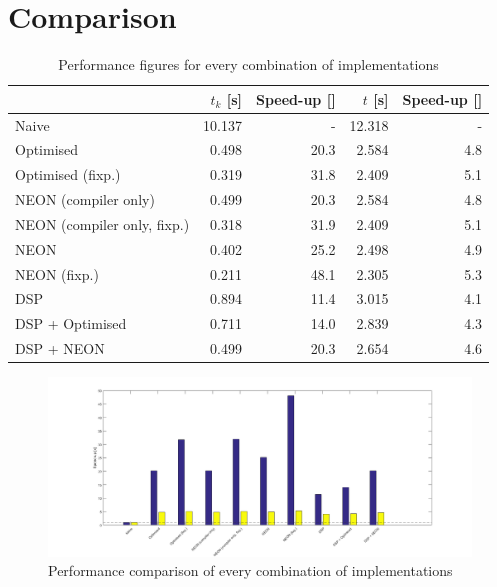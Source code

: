 \documentclass[final]{article}
\begin{document}
\section{Comparison}
\label{sec:comparison}

\begin{table}[H]
	\centering
	\caption{Performance figures for every combination of implementations}
	\begin{tabular}{lrrrr}
		\toprule
									& \textbf{$t_k$ [\si{\second}]}	& \textbf{Speed-up [\si{\speedup}]}	& \textbf{$t$ [\si{\second}]}	& \textbf{Speed-up [\si{\speedup}]} \\
		\midrule
		Naive						& 10.137						& -			 						& 12.318						& -									\\
		Optimised					&  0.498						& 20.3		 						&  2.584						& 4.8								\\
		Optimised (fixp.)			&  0.319						& 31.8		 						&  2.409						& 5.1								\\
		NEON (compiler only)		&  0.499						& 20.3		 						&  2.584						& 4.8								\\
		NEON (compiler only, fixp.)	&  0.318						& 31.9		 						&  2.409						& 5.1								\\
		NEON						&  0.402						& 25.2		 						&  2.498						& 4.9								\\
		NEON (fixp.)				&  0.211						& 48.1		 						&  2.305						& 5.3								\\
		DSP							&  0.894						& 11.4		 						&  3.015						& 4.1								\\
		DSP + Optimised				&  0.711						& 14.0		 						&  2.839						& 4.3								\\
		DSP + NEON					&  0.499						& 20.3		 						&  2.654						& 4.6								\\
		\bottomrule
	\end{tabular}
	\label{tab:comparison}
\end{table}

\setlength\figureheight{6cm}
\setlength\figurewidth{9cm}
\begin{figure}[H]
	\centering
	\includegraphics[width=\linewidth]{resources/comparison.png}
	\caption{Performance comparison of every combination of implementations}
	\label{fig:comparison}
\end{figure}
\end{document}
